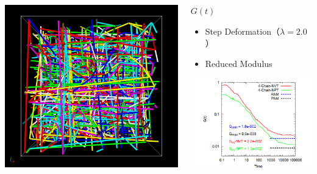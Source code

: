 \documentclass[12pt, dvipdfmx]{beamer}
\begin{document}
\begin{frame}
\begin{columns}[c, onlytextwidth]
\begin{itemize}
					\includegraphics[width=.62\textwidth]{z_cord_4Chain.png}
				\end{itemize}
			\begin{block}{$G(t)$}
				\begin{itemize}
					\item Step Deformation（$\lambda=2.0$）
					\item Reduced Modulus
				\end{itemize}
					\includegraphics[width=\textwidth]{gt_4chain_comp.png}
				\end{block}
		\end{columns}
\end{frame}
\end{document}
